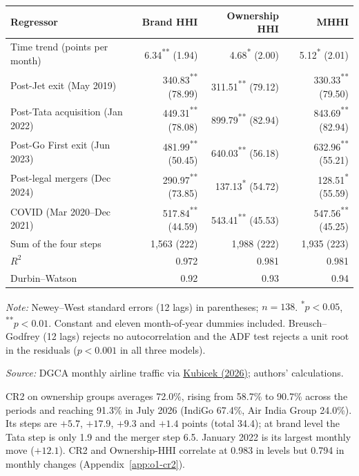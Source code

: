 \documentclass[12pt,a4paper]{article}
\begin{document}
{\begin{minipage}{\linewidth}
\label{tab:o1-regression}
\centering
{\small{}\setlength{\tabcolsep}{5pt}
\begin{tabular}{@{}lrrr@{}}
\toprule
Regressor & Brand HHI & Ownership HHI & MHHI \\
\midrule
Time trend (points per month) & 6.34\textsuperscript{**} (1.94) & 4.68\textsuperscript{*} (2.00) & 5.12\textsuperscript{*} (2.01) \\
Post-Jet exit (May 2019) & 340.83\textsuperscript{**} (78.99) & 311.51\textsuperscript{**} (79.12) & 330.33\textsuperscript{**} (79.50) \\
Post-Tata acquisition (Jan 2022) & 449.31\textsuperscript{**} (78.08) & 899.79\textsuperscript{**} (82.94) & 843.69\textsuperscript{**} (82.94) \\
Post-Go First exit (Jun 2023) & 481.99\textsuperscript{**} (50.45) & 640.03\textsuperscript{**} (56.18) & 632.96\textsuperscript{**} (55.21) \\
Post-legal mergers (Dec 2024) & 290.97\textsuperscript{**} (73.85) & 137.13\textsuperscript{*} (54.72) & 128.51\textsuperscript{*} (55.59) \\
COVID (Mar 2020--Dec 2021) & 517.84\textsuperscript{**} (44.59) & 543.41\textsuperscript{**} (45.53) & 547.56\textsuperscript{**} (45.25) \\
Sum of the four steps & 1{,}563 (222) & 1{,}988 (222) & 1{,}935 (223) \\
\midrule
$R^2$ & 0.972 & 0.981 & 0.981 \\
Durbin--Watson & 0.92 & 0.93 & 0.94 \\
\bottomrule
\end{tabular}\par}
\vspace{4pt}
{\footnotesize{}\raggedright\textit{Note:} Newey--West standard errors (12 lags) in parentheses; $n=138$. \textsuperscript{*}$p<0.05$, \textsuperscript{**}$p<0.01$. Constant and eleven month-of-year dummies included. Breusch--Godfrey (12 lags) rejects no autocorrelation and the ADF test rejects a unit root in the residuals ($p<0.001$ in all three models).\par
\textit{Source:} DGCA monthly airline traffic via \href{https://github.com/mkubicek/india-aviation-stats/tree/16770ac59dae61ce7b80fd8bd67dd7f4cef280a6}{Kubicek (2026)}; authors' calculations.\par}
\end{minipage}

CR2 on ownership groups averages 72.0\%, rising from 58.7\% to 90.7\% across the periods and reaching 91.3\% in July 2026 (IndiGo 67.4\%, Air India Group 24.0\%). Its steps are $+5.7$, $+17.9$, $+9.3$ and $+1.4$ points (total 34.4); at brand level the Tata step is only 1.9 and the merger step 6.5. January 2022 is its largest monthly move ($+12.1$). CR2 and Ownership-HHI correlate at 0.983 in levels but 0.794 in monthly changes (Appendix~\ref{app:o1-cr2}).
\par}
\end{document}
